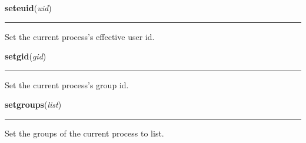     \label{os:seteuid}

    \vspace{0.5ex}

\hspace{.8\funcindent}\begin{boxedminipage}{\funcwidth}

    \raggedright \textbf{seteuid}(\textit{uid})

    \vspace{-1.5ex}

    \rule{\textwidth}{0.5\fboxrule}
\setlength{\parskip}{2ex}
    Set the current process's effective user id.

\setlength{\parskip}{1ex}
    \end{boxedminipage}

    \label{os:setgid}

    \vspace{0.5ex}

\hspace{.8\funcindent}\begin{boxedminipage}{\funcwidth}

    \raggedright \textbf{setgid}(\textit{gid})

    \vspace{-1.5ex}

    \rule{\textwidth}{0.5\fboxrule}
\setlength{\parskip}{2ex}
    Set the current process's group id.

\setlength{\parskip}{1ex}
    \end{boxedminipage}

    \label{os:setgroups}

    \vspace{0.5ex}

\hspace{.8\funcindent}\begin{boxedminipage}{\funcwidth}

    \raggedright \textbf{setgroups}(\textit{list})

    \vspace{-1.5ex}

    \rule{\textwidth}{0.5\fboxrule}
\setlength{\parskip}{2ex}
    Set the groups of the current process to list.

\setlength{\parskip}{1ex}
    \end{boxedminipage}

    \label{os:setpgid}

